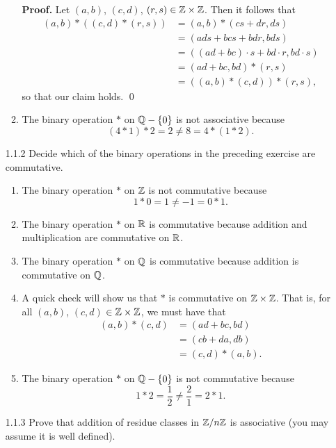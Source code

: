 \begin{enumerate}
\begin{enumerate}
               \textbf{Proof.} Let $(a, b)$, $(c, d)$,
               $(r, s) \in \mathbb{Z} \times \mathbb{Z}$. Then it follows that
               \begin{align*}
                  (a, b) * ((c, d) * (r, s)) 
                     &= (a, b) * (cs + dr, ds) \\
                     &= (ads + bcs + bdr, bds) \\
                     &= ((ad + bc) \cdot s + bd \cdot r, bd \cdot s) \\
                     &= (ad + bc, bd) * (r, s) \\
                     &= ((a, b) * (c, d)) * (r, s),
               \end{align*}
               so that our claim holds. \qed
         \item The binary operation $*$ on $\mathbb{Q} - \{0\}$ is not associative
               because
               $$(4 * 1) * 2 = 2 \neq 8 = 4 * (1 * 2).$$
      \end{enumerate}
   \item[1.1.2]   Decide which of the binary operations in the preceding
                  exercise are commutative.
                  
      \begin{enumerate}      
         \item The binary operation $*$ on $\mathbb{Z}$ is not commutative because
               $$1 * 0 = 1 \neq -1 = 0 * 1.$$
         \item The binary operation $*$ on $\mathbb{R}$ is commutative because addition
               and multiplication are commutative on $\mathbb{R}$.
         \item The binary operation $*$ on $\mathbb{Q}$ is commutative because addition
               is commutative on $\mathbb{Q}$.
         \item A quick check will show us that $*$ is commutative on
               $\mathbb{Z} \times \mathbb{Z}$. That is, for all $(a, b)$, $(c, d)$
               $\in \mathbb{Z} \times \mathbb{Z}$, we must have that
               \begin{align*}
                  (a, b) * (c, d) &= (ad + bc, bd) \\
                                          &= (cb + da, db) \\
                                          &= (c, d) * (a, b).
               \end{align*}
         \item The binary operation $*$ on $\mathbb{Q} - \{0\}$ is not commutative
               because
               $$1 * 2 = \frac{1}{2} \neq \frac{2}{1} = 2 * 1.$$
      \end{enumerate}
   \item[1.1.3]   Prove that addition of residue classes in $\mathbb{Z}/n\mathbb{Z}$ is
                  associative (you may assume it is well defined).
                  

\end{enumerate}
